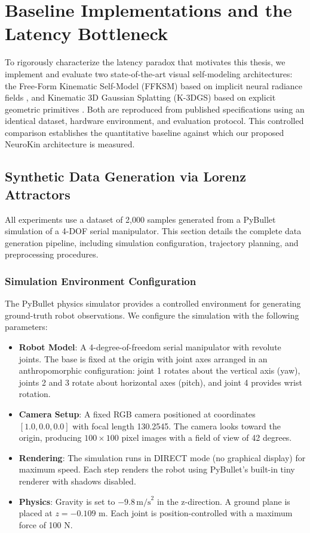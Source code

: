 \documentclass[12pt,a4paper,oneside]{report}
\begin{document}
\chapter{Baseline Implementations and the Latency Bottleneck}
\label{chap:baseline_latency_bottleneck}

To rigorously characterize the latency paradox that motivates this thesis, we implement and evaluate two state-of-the-art visual self-modeling architectures: the Free-Form Kinematic Self-Model (FFKSM) based on implicit neural radiance fields \cite{hu2024teaching}, and Kinematic 3D Gaussian Splatting (K-3DGS) based on explicit geometric primitives \cite{hu2025learning}. Both are reproduced from published specifications using an identical dataset, hardware environment, and evaluation protocol. This controlled comparison establishes the quantitative baseline against which our proposed NeuroKin architecture is measured.

\section{Synthetic Data Generation via Lorenz Attractors}

All experiments use a dataset of 2,000 samples generated from a PyBullet simulation of a 4-DOF serial manipulator. This section details the complete data generation pipeline, including simulation configuration, trajectory planning, and preprocessing procedures.

\subsection{Simulation Environment Configuration}

The PyBullet physics simulator provides a controlled environment for generating ground-truth robot observations. We configure the simulation with the following parameters:
\begin{itemize}
    \item \textbf{Robot Model}: A 4-degree-of-freedom serial manipulator with revolute joints. The base is fixed at the origin with joint axes arranged in an anthropomorphic configuration: joint 1 rotates about the vertical axis (yaw), joints 2 and 3 rotate about horizontal axes (pitch), and joint 4 provides wrist rotation.
    \item \textbf{Camera Setup}: A fixed RGB camera positioned at coordinates $[1.0, 0.0, 0.0]$ with focal length 130.2545. The camera looks toward the origin, producing $100 \times 100$ pixel images with a field of view of 42 degrees.
    \item \textbf{Rendering}: The simulation runs in DIRECT mode (no graphical display) for maximum speed. Each step renders the robot using PyBullet's built-in tiny renderer with shadows disabled.
    \item \textbf{Physics}: Gravity is set to $-9.8 \, \text{m/s}^2$ in the z-direction. A ground plane is placed at $z = -0.109$ m. Each joint is position-controlled with a maximum force of 100 N.
\end{itemize}
\end{document}
